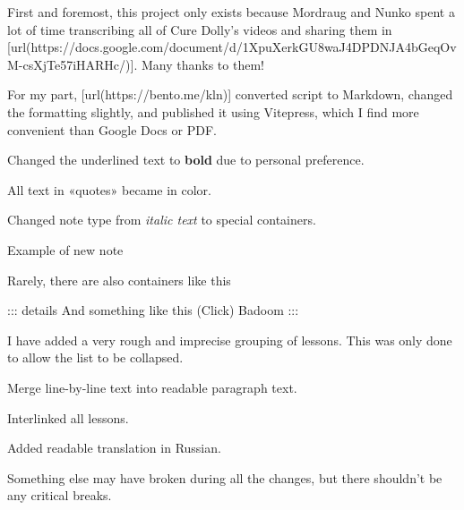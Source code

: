 \startsectionlevel[title={Intro},reference={intro}]

First and foremost, this project only exists because Mordraug and Nunko spent a lot of time transcribing all of Cure Dolly's videos and sharing them in [url(https://docs.google.com/document/d/1XpuXerkGU8waJ4DPDNJA4bGeqOvM-csXjTe57iHARHc/)]. Many thanks to them!

For my part, [url(https://bento.me/kln)] converted script to Markdown, changed the formatting slightly, and published it using Vitepress, which I find more convenient than Google Docs or PDF.

\startsectionlevel[title={What's changed},reference={whats-changed}]

\startenumerate[n,packed][stopper=.]
\item
  Changed the underlined text to {\bf bold} due to personal preference.
\item
  All text in «quotes» became  in color.
\item
  Changed note type from {\em italic text} to special containers.
\stopenumerate

Example of new note

Rarely, there are also containers like this

::: details And something like this (Click) Badoom :::

\startenumerate[n,packed][start=4,stopper=.]
\item
  I have added a very rough and imprecise grouping of lessons. This was only done to allow the list to be collapsed.
\item
  Merge line-by-line text into readable paragraph text.
\item
  Interlinked all lessons.
\item
  Added readable translation in Russian.
\stopenumerate

Something else may have broken during all the changes, but there shouldn't be any critical breaks.

\stopsectionlevel

\stopsectionlevel
